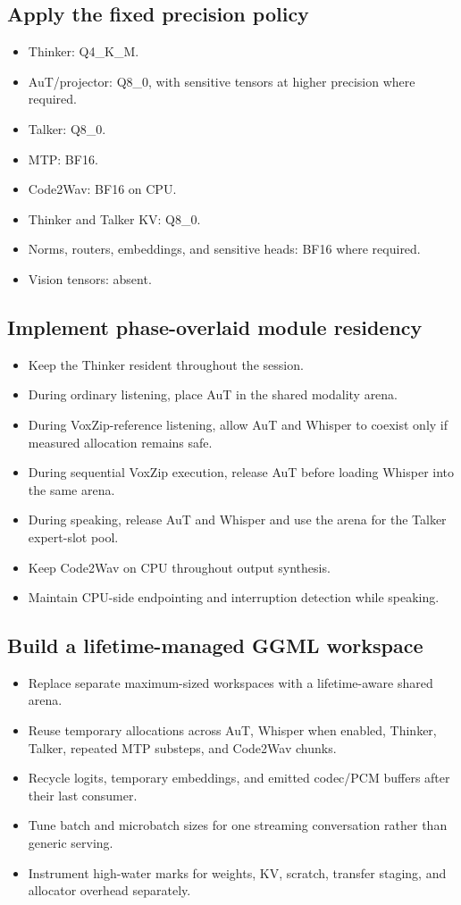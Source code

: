 \documentclass[10pt,letterpaper]{article}
\begin{document}
\subsection{Apply the fixed precision policy}
\begin{itemize}
    \item Thinker: Q4\_K\_M.
    \item AuT/projector: Q8\_0, with sensitive tensors at higher precision where required.
    \item Talker: Q8\_0.
    \item MTP: BF16.
    \item Code2Wav: BF16 on CPU.
    \item Thinker and Talker KV: Q8\_0.
    \item Norms, routers, embeddings, and sensitive heads: BF16 where required.
    \item Vision tensors: absent.
\end{itemize}

\subsection{Implement phase-overlaid module residency}
\begin{itemize}
    \item Keep the Thinker resident throughout the session.
    \item During ordinary listening, place AuT in the shared modality arena.
    \item During VoxZip-reference listening, allow AuT and Whisper to coexist only if measured allocation remains safe.
    \item During sequential VoxZip execution, release AuT before loading Whisper into the same arena.
    \item During speaking, release AuT and Whisper and use the arena for the Talker expert-slot pool.
    \item Keep Code2Wav on CPU throughout output synthesis.
    \item Maintain CPU-side endpointing and interruption detection while speaking.
\end{itemize}

\subsection{Build a lifetime-managed GGML workspace}
\begin{itemize}
    \item Replace separate maximum-sized workspaces with a lifetime-aware shared arena.
    \item Reuse temporary allocations across AuT, Whisper when enabled, Thinker, Talker, repeated MTP substeps, and Code2Wav chunks.
    \item Recycle logits, temporary embeddings, and emitted codec/PCM buffers after their last consumer.
    \item Tune batch and microbatch sizes for one streaming conversation rather than generic serving.
    \item Instrument high-water marks for weights, KV, scratch, transfer staging, and allocator overhead separately.
\end{itemize}
\end{document}

